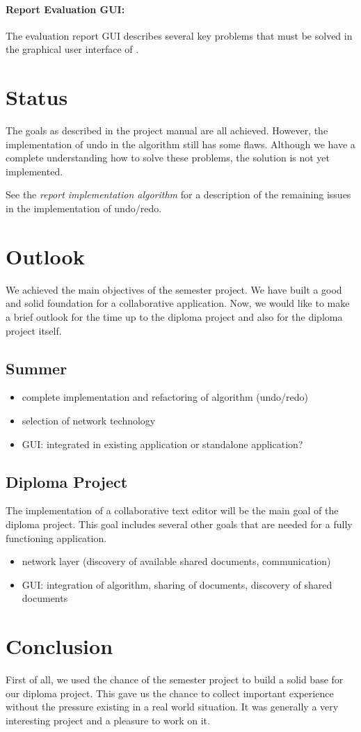 \documentclass[11pt,a4paper]{article}
\begin{document}
\paragraph{Report Evaluation GUI:}
The evaluation report GUI describes several key problems that must be solved in the graphical user interface of \ace.


\section{Status}
The goals as described in the project manual are all achieved. However, the implementation of undo in the algorithm still has some flaws. Although we have a complete understanding how to solve these problems, the solution is not yet implemented.

See the \emph{report implementation algorithm} for a description of the remaining issues in the implementation of undo/redo.


\section{Outlook}
We achieved the main objectives of the semester project. We have built a good and solid foundation for a collaborative application. Now, we would like to make a brief outlook for the time up to the diploma project and also for the diploma project itself.

\subsection{Summer}
\begin{itemize}
 \item complete implementation and refactoring of algorithm (undo/redo)
 \item selection of network technology
 \item GUI: integrated in existing application or standalone application?
\end{itemize}

\subsection{Diploma Project}
The implementation of a collaborative text editor will be the main goal of the diploma project. This goal includes several other goals that are needed for a fully functioning application.
\begin{itemize}
 \item network layer (discovery of available shared documents, communication)
 \item GUI: integration of algorithm, sharing of documents, discovery of shared documents
\end{itemize}

\section{Conclusion}
First of all, we used the chance of the semester project to build a solid base for our diploma project. This gave us the chance to collect important experience without the pressure existing in a real world situation. It was generally a very interesting project and a pleasure to work on it.
\end{document}
